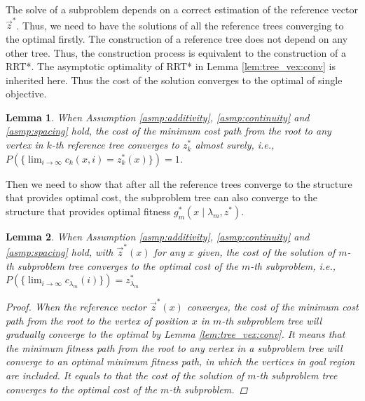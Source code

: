 \documentclass[conference]{IEEEtran}
\newtheorem{lem}{Lemma}
\begin{document}
The solve of a subproblem depends on a correct estimation of the reference vector $ \vec{z}^{*} $.
Thus, we need to have the solutions of all the reference trees converging to the optimal firstly.
The construction of a reference tree does not depend on any other tree.
Thus, the construction process is equivalent to the construction of a RRT*.
The asymptotic optimality of RRT* in Lemma \ref{lem:tree_vex:conv} is inherited here.
Thus the cost of the solution converges to the optimal of single objective.
\begin{lem}
\label{lem:ref_tree:conv}
When Assumption \ref{asmp:additivity}, \ref{asmp:continuity} and \ref{asmp:spacing} hold,
the cost of the minimum cost path from the root to any vertex in $ k $-th reference tree converges to $ z^{*}_{k} $ almost surely, i.e., 
$ P( \{ \lim_{ i \rightarrow \infty }  c_{k} (x, i ) = z^{*}_{k} (x) \} ) = 1  $.
\end{lem}

Then we need to show that after all the reference trees converge to the structure that provides optimal cost, 
the subproblem tree can also converge to the structure that provides optimal fitness $ g^{*}_{m} ( x \mid \lambda_{m} , z^{*} ) $.
\begin{lem}
\label{lem:sub_tree:conv}
When Assumption \ref{asmp:additivity}, \ref{asmp:continuity} and \ref{asmp:spacing} hold,
with $ \vec{z}^{*} (x) $ for any $ x $ given,
the cost of the solution of $ m $-th subproblem tree converges to the optimal cost of the $ m $-th subproblem, i.e.,
$
P( \{ \lim_{ i \rightarrow \infty } c_{ \lambda_{m} }( i ) \} ) = z^{*}_{ \lambda_{m} }
$
\begin{proof}
When the reference vector $ \vec{z}^{*}(x) $ converges, the cost of the minimum cost path from the root to the vertex of position $ x $ in $ m $-th subproblem tree will gradually converge to the optimal by Lemma \ref{lem:tree_vex:conv}.
It means that the minimum fitness path from the root to any vertex in a subproblem tree will converge to an optimal minimum fitness path, in which the vertices in goal region are included.
It equals to that the cost of the solution of $ m $-th subproblem tree converges to the optimal cost of the $ m $-th subproblem.
\end{proof}
\end{lem}
\end{document}
